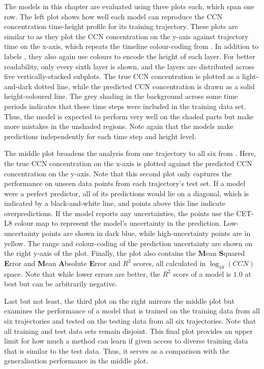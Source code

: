 The models in this chapter are evaluated using three plots each, which span one row. The left plot shows how well each model can reproduce the CCN concentration time-height profile for its training trajectory. These plots are similar to  as they plot the CCN concentration on the y-axis against trajectory time on the x-axis, which repeats the timeline colour-coding from . In addition to labels \cite{mpl-label-lines-2022}, they also again use colours to encode the height of each layer. For better readability, only every sixth layer is shown, and the layers are distributed across five vertically-stacked subplots. The true CCN concentration is plotted as a light-and-dark dotted line, while the predicted CCN concentration is drawn as a solid height-coloured line. The grey shading in the background across some time periods indicates that these time steps were included in the training data set. Thus, the model is expected to perform very well on the shaded parts but make more mistakes in the unshaded regions. Note again that the models make predictions independently for each time step and height level.

The middle plot broadens the analysis from one trajectory to all six from . Here, the true CCN concentration on the x-axis is plotted against the predicted CCN concentration on the y-axis. Note that this second plot only captures the performance on unseen data points from each trajectory's test set. If a model were a perfect predictor, all of its predictions would lie on a diagonal, which is indicated by a black-and-white line, and points above this line indicate overpredictions. If the model reports any uncertainties, the points use the CET-L8 colour map \cite{color-cet-2015, color-cet-2023} to represent the model's uncertainty in the prediction. Low-uncertainty points are shown in dark blue, while high-uncertainty points are in yellow. The range and colour-coding of the prediction uncertainty are shown on the right y-axis of the plot. Finally, the plot also contains the \textbf{M}ean \textbf{S}quared \textbf{E}rror and \textbf{M}ean \textbf{A}bsolute \textbf{E}rror and $R^2$ scores, all calculated in $\log_{10}(CCN)$ space. Note that while lower errors are better, the $R^2$ score of a model is $1.0$ at best but can be arbitrarily negative.

Last but not least, the third plot on the right mirrors the middle plot but examines the performance of a model that is trained on the training data from all six trajectories and tested on the testing data from all six trajectories. Note that all training and test data sets remain disjoint. This final plot provides an upper limit for how much a method can learn if given access to diverse training data that is similar to the test data. Thus, it serves as a comparison with the generalisation performance in the middle plot.

